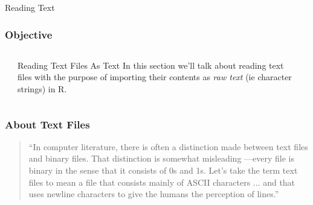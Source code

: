 \documentclass{beamer}\usepackage[]{graphicx}\usepackage[]{color}
\begin{document}

\begin{frame}
 \begin{center}
  \Huge{\textcolor{mandarina}{Reading Text}}
 \end{center}
\end{frame}


\begin{frame}
\frametitle{Objective}

\begin{columns}[t]
\begin{column}{0.1\textwidth}
\end{column}
\begin{column}{0.8\textwidth}

\begin{block}{Reading Text Files As Text}
In this section we'll talk about reading text files with the purpose of importing their contents as \textit{raw text} (ie character strings) in R.
\end{block}

\end{column}
\begin{column}{0.1\textwidth}
\end{column}
\end{columns}

\end{frame}


\begin{frame}
\frametitle{About Text Files}

\begin{quotation}
``In computer literature, there is often a distinction made between text files and binary files. That distinction is somewhat misleading ---every file is binary in the sense that it consists of 0s and 1s. Let's take the term text files to mean a file that consists mainly of ASCII characters ... and that uses newline characters to give the humans the perception of lines.''
\end{quotation}

{\footnotesize 
\hspace{8mm}  \\
\hspace{8mm} 
}

\end{frame}
\end{document}
